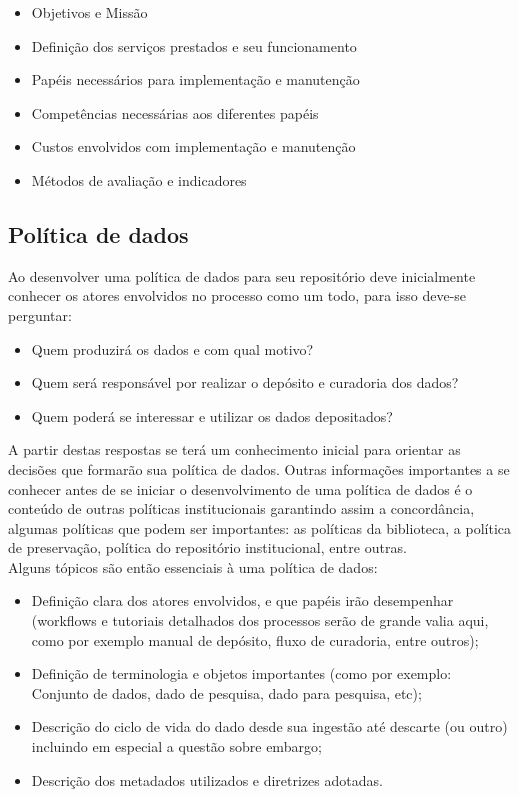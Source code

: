 \documentclass[12pt,hidelinks]{article}
\begin{document}
\begin{itemize}
    \item Objetivos e Missão
    \item Definição dos serviços prestados e seu funcionamento
    \item Papéis necessários para implementação e manutenção
    \item Competências necessárias aos diferentes papéis
    \item Custos envolvidos com implementação e manutenção
    \item Métodos de avaliação e indicadores
\end{itemize}

\subsection{Política de dados}

\qquad Ao desenvolver uma política de dados para seu repositório deve inicialmente conhecer os atores envolvidos no processo como um todo, para isso deve-se perguntar:

\begin{itemize}
    \item Quem produzirá os dados e com qual motivo?
    \item Quem será responsável por realizar o depósito e curadoria dos dados?
    \item Quem poderá se interessar e utilizar os dados depositados?
\end{itemize}

A partir  destas respostas se terá um conhecimento inicial para orientar as decisões que formarão sua política de dados. Outras informações importantes a se conhecer antes de se iniciar o desenvolvimento de uma política de dados é o conteúdo de outras políticas institucionais garantindo assim a concordância, algumas políticas que podem ser importantes: as políticas da biblioteca, a política de preservação, política do repositório institucional, entre outras.\\

Alguns tópicos são então essenciais à uma política de dados:

\begin{itemize}
    \item Definição clara dos atores envolvidos, e que papéis irão desempenhar (workflows e tutoriais detalhados dos processos serão de grande valia aqui, como por exemplo manual de depósito, fluxo de curadoria, entre outros);
    \item Definição de terminologia  e objetos importantes (como por exemplo: Conjunto de dados, dado de pesquisa, dado para pesquisa, etc);
    \item Descrição do ciclo de vida do dado desde sua ingestão até descarte (ou outro) incluindo em especial a questão sobre embargo;
    \item Descrição dos metadados utilizados e diretrizes adotadas.
\end{itemize}
\end{document}
